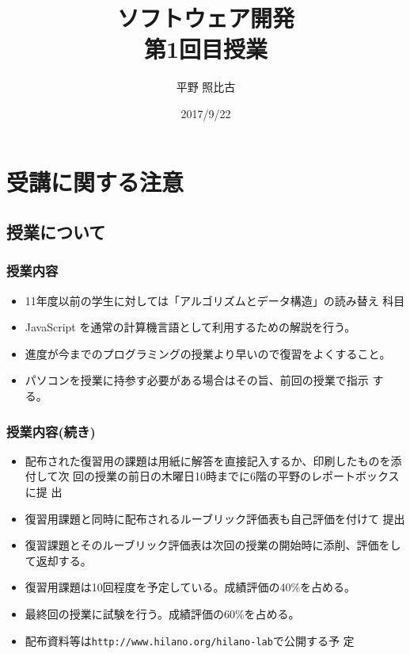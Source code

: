 
\title{ソフトウェア開発\\第1回目授業}
\author{平野 照比古}
\institute{}
\date{2017/9/22}

\frame{\maketitle}
\section{受講に関する注意}
\subsection{授業について}
\begin{frame}
 \frametitle{授業内容}
\begin{itemize}
 \item 11年度以前の学生に対しては「アルゴリズムとデータ構造」の読み替え
       科目
 \item JavaScript を通常の計算機言語として利用するための解説を行う。
 \item 進度が今までのプログラミングの授業より早いので復習をよくすること。
 \item パソコンを授業に持参す必要がある場合はその旨、前回の授業で指示
       する。
\end{itemize}
\end{frame}
\begin{frame}
 \frametitle{授業内容(続き)}
\begin{itemize}
  \item 配布された復習用の課題は用紙に解答を直接記入するか、印刷したものを添付して次
        回の授業の前日の木曜日10時までに6階の平野のレポートボックスに提
        出
 \item 復習用課題と同時に配布されるルーブリック評価表も自己評価を付けて
       提出
 \item 復習課題とそのルーブリック評価表は次回の授業の開始時に添削、評価をして返却する。
 \item 復習用課題は10回程度を予定している。成績評価の40\%を占める。
\item 最終回の授業に試験を行う。成績評価の60\%を占める。
 \item 配布資料等は\texttt{http://www.hilano.org/hilano-lab}で公開する予
       定
\end{itemize}
\end{frame}
